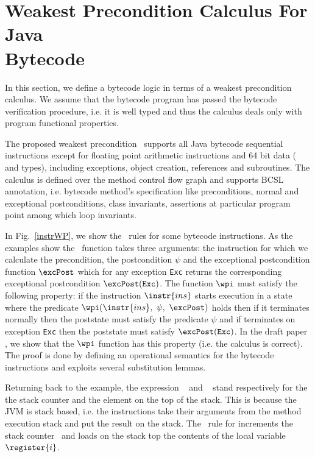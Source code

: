 
\section{Weakest Precondition Calculus For Java \\  Bytecode}\label{wpbc}
In this section, we define a bytecode logic in terms of a weakest precondition calculus.
We assume that the bytecode program has passed the bytecode verification procedure, i.e. it is well typed and
 thus the calculus deals only with program functional properties. 

The proposed weakest precondition \wpi \ supports all Java bytecode sequential instructions except for floating point
 arithmetic instructions and 64 bit data ( and  types), including exceptions, object creation,
 references and subroutines. The calculus is defined over the method control flow graph and supports BCSL annotation,
 i.e. bytecode method's specification like preconditions, normal and exceptional postconditions, class invariants,
 assertions at particular program point among which loop invariants.

 In Fig.~\ref{instrWP}, we show the \wpi \ rules for some bytecode instructions. 
As the examples show the \wpi \ function takes three arguments:
the instruction for which we calculate the precondition, 
the postcondition $\psi$ and the exceptional postcondition function $\excPost$ which for any exception \texttt{Exc} returns the
corresponding exceptional postcondition $\excPost(\texttt{Exc})$. 
The function $\wpi$ must satisfy the following property: if the instruction $\instr{ins}$ starts execution in a state where the predicate
$\wpi(\instr{ins}, \ \psi, \ \excPost)$ holds then if it terminates normally then the poststate must satisfy the predicate $\psi$  
and if terminates on exception \texttt{Exc} then  the poststate must satisfy $\excPost(\texttt{Exc})$.
 In the draft paper \cite{JBL05MP}, we show that the $\wpi$ function has this property (i.e. the calculus is correct). The proof is done by defining an operational semantics for the bytecode instructions and exploits several substitution lemmas.

Returning back to the example, the expression \counter~ and  \stack{\counter}~ stand respectively for the the stack counter and the element on the top of the stack.
 This is because the JVM is stack based, i.e. the instructions take their arguments from the method execution stack and 
 put the result on the stack.
 The \wpi \ rule for   increments the stack counter \counter \ and loads on the stack top the contents
 of the local variable $\register{i}$. 

